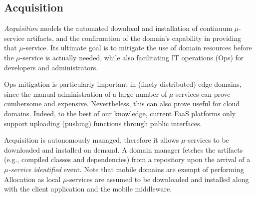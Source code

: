 


\subsection{Acquisition}\label{sec:A3-E-acquisition}

\textit{Acquisition} models the automated download and installation of continuum $\mu$-service artifacts, and the confirmation of the domain's capability in providing that $\mu$-service. Its ultimate goal is to mitigate the use of domain resources before the $\mu$-service is actually needed, while also facilitating IT operations (Ops) for developers and administrators. 

Ops mitigation is particularly important in (finely distributed) edge domains, since the manual administration of a large number of $\mu$-services can prove cumbersome and expensive. Nevertheless, this can also prove useful for cloud domains. Indeed, to the best of our knowledge, current FaaS platforms only support uploading (pushing) functions through public interfaces. 

Acquisition is autonomously managed, therefore it allows $\mu$-services to be downloaded 
and installed on demand. A domain manager fetches the artifacts (e.g., compiled classes and dependencies) from a repository upon the arrival of a \textit{$\mu$-service identified} event. Note that mobile domains are exempt of performing Allocation as local $\mu$-services are assumed to be downloaded and installed along with the client application and the mobile middleware. 

